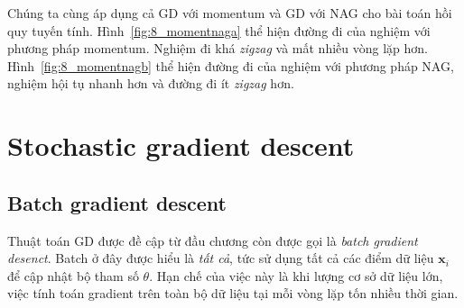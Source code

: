 Chúng ta cùng áp dụng cả GD với momentum và GD với NAG cho bài toán hồi quy
tuyến tính. Hình~\ref{fig:8_momentnaga} thể hiện đường đi của nghiệm với phương
pháp momentum. Nghiệm đi khá \textit{zigzag} và mất nhiều vòng lặp hơn.
Hình~\ref{fig:8_momentnagb} thể hiện đường đi của nghiệm với phương pháp NAG,
nghiệm hội tụ nhanh hơn và đường đi ít \textit{zigzag} hơn.






\section{Stochastic gradient descent}




\subsection{Batch gradient descent }
Thuật toán GD được đề cập từ đầu chương còn được gọi là \textit{batch gradient
desenct}. Batch ở đây được hiểu là \textit{tất cả}, tức sử dụng {tất cả} các điểm dữ liệu $\mathbf{x}_i$ để cập nhật bộ tham số $\theta$. Hạn chế của
việc này là khi lượng cơ sở dữ liệu lớn, việc tính toán gradient trên toàn bộ dữ
liệu tại mỗi vòng lặp tốn nhiều thời gian.

